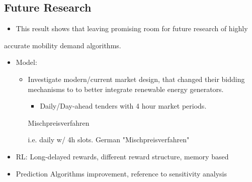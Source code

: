 \documentclass[a4paper, 12pt]{article}
\begin{document}
\subsection{Future Research}
\label{sec:org144ab16}

\begin{itemize}
\item This result shows that leaving promising room for future research of highly
\end{itemize}
accurate mobility demand algorithms.
\begin{itemize}
\item Model:
\begin{itemize}
\item Investigate modern/current market design, that changed their bidding
mechanisms to to better integrate renewable energy generators.
\begin{itemize}
\item Daily/Day-ahead tenders with 4 hour market periods.
\end{itemize}

Mischpreisverfahren

i.e. daily w/ 4h slots. German "Mischpreisverfahren"
\end{itemize}
\item RL: Long-delayed rewards, different reward structure, memory based
\item Prediction Algorithms improvement, reference to sensitivity analysis
\end{itemize}

\clearpage
\end{document}
